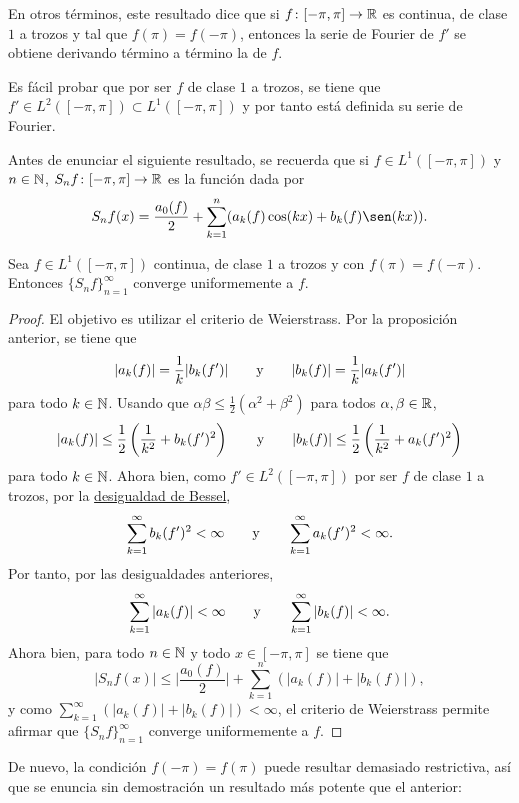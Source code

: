 \documentclass[a4paper, 12pt, extrafontsizes]{memoir}
\begin{document}
En otros términos, este resultado dice que si $f \colon [-\pi,\pi] \to \mathbb R$ es continua, de clase $1$ a trozos y tal que $f(\pi) = f(-\pi)$, entonces la serie de Fourier de $f'$ se obtiene derivando término a término la de $f$.

Es fácil probar que por ser $f$ de clase $1$ a trozos, se tiene que $f' \in L^2([-\pi,\pi]) \subset L^1([-\pi,\pi])$ y por tanto está definida su serie de Fourier.

Antes de enunciar el siguiente resultado, se recuerda que si $f \in L^1([-\pi,\pi])$ y $n \in \mathbb N$, $S_nf \colon [-\pi,\pi] \to \mathbb R$ es la función dada por
\[S_nf(x) = \frac{a_0(f)}{2}+\sum_{k=1}^n (a_k(f)\cos(kx) + b_k(f)\sen(kx)).\]

\begin{theorem}\label{teo:A.4.2}
    Sea $f \in L^1([-\pi,\pi])$ continua, de clase $1$ a trozos y con $f(\pi) = f(-\pi)$. Entonces $\{S_nf\}_{n=1}^\infty$ converge uniformemente a $f$.
\end{theorem}

\begin{proof}
    El objetivo es utilizar el criterio de Weierstrass. Por la proposición anterior, se tiene que
    \[|a_k(f)| = \frac{1}{k}|b_k(f')| \qquad \textup{y} \qquad |b_k(f)| = \frac{1}{k}|a_k(f')|\]
    para todo $k \in \mathbb N$. Usando que $\alpha\beta \leq \frac{1}{2}(\alpha^2+\beta^2)$ para todos $\alpha,\beta \in \mathbb R$,
    \[|a_k(f)| \leq \frac{1}{2}\left(\frac{1}{k^2}+b_k(f')^2\right) \qquad \textup{y} \qquad |b_k(f)| \leq\frac{1}{2}\left( \frac{1}{k^2}+a_k(f')^2\right)\]
    para todo $k \in \mathbb N$. Ahora bien, como $f' \in L^2([-\pi,\pi])$ por ser $f$ de clase $1$ a trozos, por la \hyperref[cor:A.1.11]{\color{gray}desigualdad de Bessel},
    \[\sum_{k=1}^\infty b_k(f')^2 < \infty \qquad \textup{y} \qquad \sum_{k=1}^\infty a_k(f')^2 < \infty.\]
    Por tanto, por las desigualdades anteriores,
    \[\sum_{k=1}^\infty |a_k(f)| < \infty \qquad \textup{y} \qquad \sum_{k=1}^\infty |b_k(f)| < \infty.\]
    Ahora bien, para todo $n \in \mathbb N$ y todo $x \in [-\pi,\pi]$ se tiene que
    \[|S_nf(x)| \leq \biggl|\frac{a_0(f)}{2}\biggr|+\sum_{k=1}^n (|a_k(f)|+|b_k(f)|),\]
    y como $\sum_{k=1}^\infty (|a_k(f)|+|b_k(f)|) < \infty$, el criterio de Weierstrass permite afirmar que $\{S_nf\}_{n=1}^\infty$ converge uniformemente a $f$.
\end{proof}

De nuevo, la condición $f(-\pi) = f(\pi)$ puede resultar demasiado restrictiva, así que se enuncia sin demostración un resultado más potente que el anterior:
\end{document}
